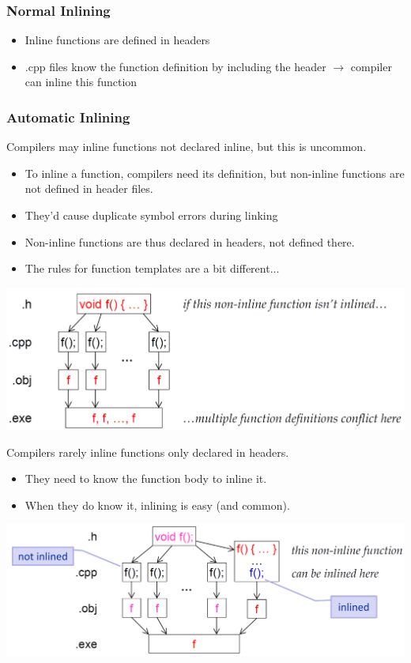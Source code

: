 \subsubsection{Normal Inlining}
\begin{itemize}
	\item Inline functions are defined in headers
	\item .cpp files know the function definition by including the header $\rightarrow$ compiler can inline this function
\end{itemize}

\subsubsection{Automatic Inlining}
\begin{multicols}{2}
Compilers may inline functions not declared inline, but this is uncommon.
\begin{itemize}
	\item To inline a function, compilers need its definition, but non-inline functions are not defined in header files.
	\item They'd cause duplicate symbol errors during linking
	\item Non-inline functions are thus declared in headers, not defined there.
	\item The rules for function templates are a bit different...
\end{itemize}
\vfill\null
\columnbreak
\includegraphics[width=\linewidth]{images/AdvancedCPP/automaticInline}
\end{multicols}
\begin{multicols}{2}
Compilers rarely inline functions only declared in headers.
\begin{itemize}
	\item They need to know the function body to inline it.
	\item When they do know it, inlining is easy (and common).
\end{itemize}
\vfill\null
\columnbreak
\includegraphics[width=\linewidth]{images/AdvancedCPP/automaticInline2}
\end{multicols}

